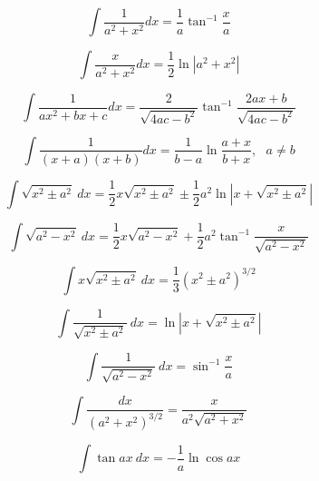     \begin{equation}
    \int \frac{1}{a^2+x^2}dx = \frac{1}{a}\tan^{-1}\frac{x}{a}
    \end{equation}
    
    \begin{equation}
    \int \frac{x}{a^2+x^2}dx = \frac{1}{2}\ln|a^2+x^2|
    \end{equation}
    
    \begin{equation}
    \int \frac{1}{ax^2+bx+c}dx = \frac{2}{\sqrt{4ac-b^2}}\tan^{-1}\frac{2ax+b}{\sqrt{4ac-b^2}}
    \end{equation}
    
    \begin{equation}
    \int \frac{1}{(x+a)(x+b)}dx = \frac{1}{b-a}\ln\frac{a+x}{b+x}, \text{ } a\ne b
    \end{equation}
    
    \begin{equation}
    \int\sqrt{x^2 \pm a^2}\ dx = \frac{1}{2}x\sqrt{x^2\pm a^2} 
    \pm\frac{1}{2}a^2 \ln \left | x + \sqrt{x^2\pm a^2} \right | 
    \end{equation}
    
    \begin{equation}
    \int  \sqrt{a^2 - x^2}\ dx = \frac{1}{2} x \sqrt{a^2-x^2} 
    +\frac{1}{2}a^2\tan^{-1}\frac{x}{\sqrt{a^2-x^2}}
    \end{equation}
    
    \begin{equation}
    \int  x \sqrt{x^2 \pm a^2}\ dx= \frac{1}{3}\left ( x^2 \pm a^2 \right)^{3/2} 
    \end{equation}
    
    \begin{equation}
    \int \frac{1}{\sqrt{x^2 \pm a^2}}\ dx = \ln \left | x + \sqrt{x^2 \pm a^2} \right | 
    \end{equation}
    
    \begin{equation}
    \int \frac{1}{\sqrt{a^2 - x^2}}\ dx = \sin^{-1}\frac{x}{a} 
    \end{equation}

    \begin{equation}\label{eq:Winokur2}
    \int\frac{dx}{(a^2+x^2)^{3/2}}=\frac{x}{a^2\sqrt{a^2+x^2}}
    \end{equation}
        
    \begin{equation}
    \int \tan ax\ dx = -\frac{1}{a} \ln \cos ax 
    \end{equation}
    
